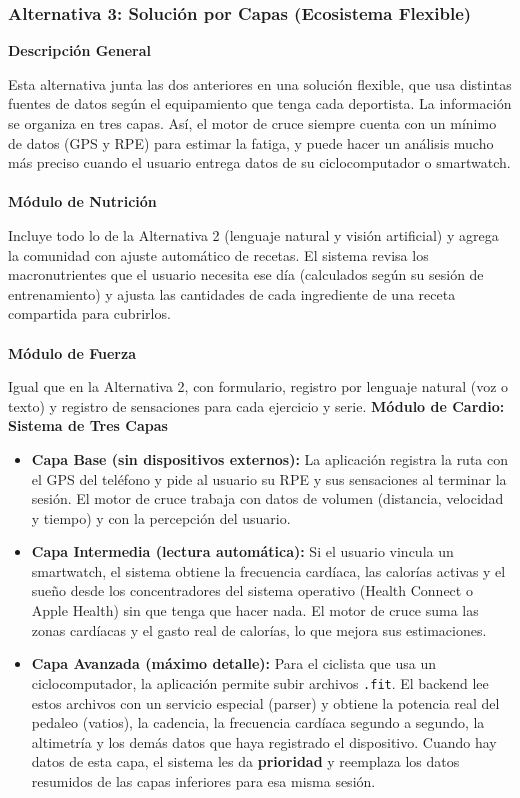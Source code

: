 \subsubsection{Alternativa 3: Solución por Capas (Ecosistema Flexible)}

\textbf{Descripción General}

Esta alternativa junta las dos anteriores en una solución flexible, que usa distintas fuentes de datos según el equipamiento que tenga cada deportista. La información se organiza en tres capas. Así, el motor de cruce siempre cuenta con un mínimo de datos (GPS y RPE) para estimar la fatiga, y puede hacer un análisis mucho más preciso cuando el usuario entrega datos de su ciclocomputador o smartwatch.
\\\\
\textbf{Módulo de Nutrición}

Incluye todo lo de la Alternativa 2 (lenguaje natural y visión artificial) y agrega la comunidad con ajuste automático de recetas. El sistema revisa los macronutrientes que el usuario necesita ese día (calculados según su sesión de entrenamiento) y ajusta las cantidades de cada ingrediente de una receta compartida para cubrirlos.
\\\\
\textbf{Módulo de Fuerza}

Igual que en la Alternativa 2, con formulario, registro por lenguaje natural (voz o texto) y registro de sensaciones para cada ejercicio y serie.
\textbf{Módulo de Cardio: Sistema de Tres Capas}

\begin{itemize}
    \item \textbf{Capa Base (sin dispositivos externos):} La aplicación registra la ruta con el GPS del teléfono y pide al usuario su RPE y sus sensaciones al terminar la sesión. El motor de cruce trabaja con datos de volumen (distancia, velocidad y tiempo) y con la percepción del usuario.
    \item \textbf{Capa Intermedia (lectura automática):} Si el usuario vincula un smartwatch, el sistema obtiene la frecuencia cardíaca, las calorías activas y el sueño desde los concentradores del sistema operativo (Health Connect o Apple Health) sin que tenga que hacer nada. El motor de cruce suma las zonas cardíacas y el gasto real de calorías, lo que mejora sus estimaciones.
    \item \textbf{Capa Avanzada (máximo detalle):} Para el ciclista que usa un ciclocomputador, la aplicación permite subir archivos \texttt{.fit}. El backend lee estos archivos con un servicio especial (parser) y obtiene la potencia real del pedaleo (vatios), la cadencia, la frecuencia cardíaca segundo a segundo, la altimetría y los demás datos que haya registrado el dispositivo. Cuando hay datos de esta capa, el sistema les da \textbf{prioridad} y reemplaza los datos resumidos de las capas inferiores para esa misma sesión.
\end{itemize}

